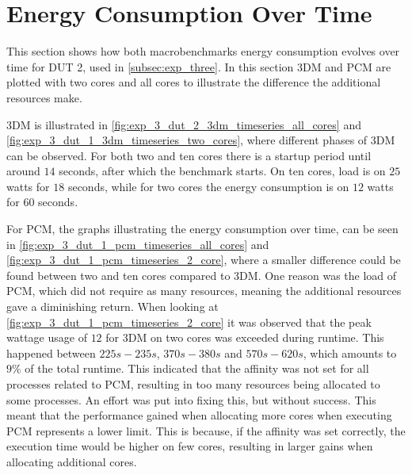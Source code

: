 \section{Energy Consumption Over Time}\label{app:timeseries}

This section shows how both macrobenchmarks energy consumption evolves over time for DUT 2, used in \cref{subsec:exp_three}. In this section 3DM and PCM are plotted with two cores and all cores to illustrate the difference the additional resources make. 

3DM is illustrated in \cref{fig:exp_3_dut_2_3dm_timeseries_all_cores} and \cref{fig:exp_3_dut_1_3dm_timeseries_two_cores}, where different phases of 3DM can be observed. For both two and ten cores there is a startup period until around $14$ seconds, after which the benchmark starts. On ten cores, load is on $25$ watts for $18$ seconds, while for two cores the energy consumption is on $12$ watts for $60$ seconds. 




For PCM, the graphs illustrating the energy consumption over time, can be seen in \cref{fig:exp_3_dut_1_pcm_timeseries_all_cores} and \cref{fig:exp_3_dut_1_pcm_timeseries_2_core}, where a smaller difference could be found between two and ten cores compared to 3DM. One reason was the load of PCM, which did not require as many resources, meaning the additional resources gave a diminishing return. When looking at \cref{fig:exp_3_dut_1_pcm_timeseries_2_core} it was observed that the peak wattage usage of $12$ for 3DM on two cores was exceeded during runtime. This happened between $225s-235s$, $370s-380s$ and $570s-620s$, which amounts to $9\%$ of the total runtime. This indicated that the affinity was not set for all processes related to PCM, resulting in too many resources being allocated to some processes. An effort was put into fixing this, but without success. This meant that the performance gained when allocating more cores when executing PCM represents a lower limit. This is because, if the affinity was set correctly, the execution time would be higher on few cores, resulting in larger gains when allocating additional cores.


